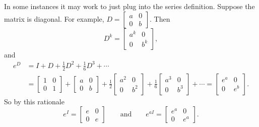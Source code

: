 In some instances it may work to just plug into the series definition.
Suppose the matrix is diagonal.
For example,
$D = \left[ \begin{smallmatrix} a & 0 \\ 0 & b \end{smallmatrix} \right]$.
Then 
\begin{equation*}
D^k = \begin{bmatrix} a^k & 0 \\ 0 & b^k \end{bmatrix} ,
\end{equation*}
and
\begin{equation*}
\begin{split}
e^D & =
I + D + \frac{1}{2} D^2 + 
\frac{1}{6} D^3 + \cdots
\\
&=
\begin{bmatrix} 1 & 0 \\ 0 & 1 \end{bmatrix} +
\begin{bmatrix} a & 0 \\ 0 & b \end{bmatrix} +
\frac{1}{2}
\begin{bmatrix} a^2 & 0 \\ 0 & b^2 \end{bmatrix} +
\frac{1}{6}
\begin{bmatrix} a^3 & 0 \\ 0 & b^3 \end{bmatrix} + \cdots
=
\begin{bmatrix} e^a & 0 \\ 0 & e^b \end{bmatrix} .
\end{split}
\end{equation*}
So by this rationale
\begin{equation*}
e^I = \begin{bmatrix} e & 0\\ 0 & e \end{bmatrix}
\qquad \text{and} \qquad
e^{aI} = \begin{bmatrix} e^a & 0\\ 0 & e^a \end{bmatrix}.
\end{equation*}

